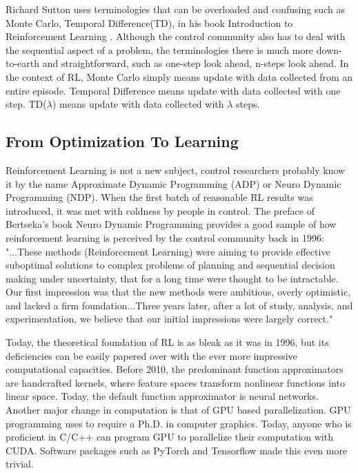 \documentclass[journal]{IEEEtran}
\begin{document}
Richard Sutton uses terminologies that can be overloaded and confusing such as Monte Carlo, Temporal Difference(TD), in his book Introduction to Reinforcement Learning \cite{Sutton1998IntroductionTR}. Although the control community also has to deal with the sequential aspect of a problem, the terminologies there is much more down-to-earth and straightforward, such as one-step look ahead, n-steps look ahead. In the context of RL, Monte Carlo simply means update with data collected from an entire episode. Temporal Difference means update with data collected with one step. TD($\lambda$) means update with data collected with $\lambda$ steps. 

\subsection{From Optimization To Learning}

Reinforcement Learning is not a new subject, control researchers probably know it by the name Approximate Dynamic Programming (ADP) or Neuro Dynamic Programming (NDP). When the first batch of reasonable RL results was introduced, it was met with coldness by people in control. The preface of Bertseka's book Neuro Dynamic Programming provides a good sample of how reinforcement learning is perceived by the control community back in 1996: "...These methods (Reinforcement Learning) were aiming to provide effective suboptimal solutions to complex problems of planning and sequential decision making under uncertainty, that for a long time were thought to be intractable. Our first impression was that the new methods were ambitious, overly optimistic, and lacked a firm foundation...Three years later, after a lot of study, analysis, and experimentation, we believe that our initial impressions were largely correct." \cite{Bertsekas1996NeuroDynamicP}

Today, the theoretical foundation of RL is as bleak as it was in 1996, but its deficiencies can be easily papered over with the ever more impressive computational capacities. Before 2010, the predominant function approximators are handcrafted kernels, where feature spaces transform nonlinear functions into linear space. Today, the default function approximator is neural networks. Another major change in computation is that of GPU based parallelization. GPU programming uses to require a Ph.D. in computer graphics. Today, anyone who is proficient in C/C++ can program GPU to parallelize their computation with CUDA\cite{Nickolls2008ScalablePP}. Software packages such as PyTorch\cite{Paszke2017AutomaticDI} and Tensorflow\cite{Abadi2016TensorFlowAS} made this even more trivial.
\end{document}
